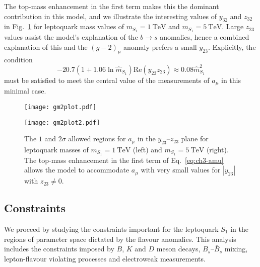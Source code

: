 The top-mass enhancement in the first term makes this the dominant contribution
in this model, and we illustrate the interesting values of $y_{32}$ and $z_{32}$
in Fig.~\ref{fig:ch3-gm2plots} for leptoquark mass values of
$m_{S_{1}}=\SI{1}{\TeV}$ and $m_{S_{1}}=\SI{5}{\TeV}$. Large $z_{23}$ values
assist the model's explanation of the $b \to s$ anomalies, hence a combined
explanation of this and the $(g-2)_\mu$ anomaly prefers a small $y_{23}$.
Explicitly, the condition~\cite{Bauer:2015knc}
\begin{equation} \label{eq:ch3-bnamueq}
  -20.7 (1 + 1.06 \ln\hat{m}_{S_{1}}) \text{Re}(y_{23} z_{23}) \approx 0.08 \hat{m}_{S_{1}}^2
\end{equation}
must be satisfied to meet the central value of the measurements of $a_\mu$ in
this minimal case.

\begin{figure}[t]
  \centering
\begin{minipage}[t]{.45\linewidth}
\centering \texttt{[image: gm2plot.pdf]}
 \label{fig:ch3-gm2plot}
\end{minipage}%
\hfill
\begin{minipage}[t]{.45\linewidth}
\centering \texttt{[image: gm2plot2.pdf]}
 \label{fig:ch3-gm2plot2}
\end{minipage}
\caption[The $1$ and $2\sigma$ allowed regions for $a_\mu$ in the
$y_{23}$--$z_{23}$ plane for leptoquark masses of $m_{S_{1}} = \SI{1}{\TeV}$
(left) and $m_{S_{1}} = \SI{5}{\TeV}$ (right).]{The $1$ and $2\sigma$ allowed
  regions for $a_\mu$ in the $y_{23}$--$z_{23}$ plane for leptoquark masses of
  $m_{S_{1}} = \SI{1}{\TeV}$ (left) and $m_{S_{1}} = \SI{5}{\TeV}$ (right). The
  top-mass enhancement in the first term of Eq.~\eqref{eq:ch3-amu} allows the model
  to accommodate $a_\mu$ with very small values for $|y_{23}|$ with
  $z_{23} \neq 0$.}\label{fig:ch3-gm2plots}
\end{figure}

\subsection{Constraints}
\label{sec:ch3-constraints}

We proceed by studying the constraints important for the leptoquark $S_{1}$ in
the regions of parameter space dictated by the flavour anomalies. This analysis
includes the constraints imposed by $B$, $K$ and $D$ meson decays,
$B_s$--$\bar{B}_s$ mixing, lepton-flavour violating processes and electroweak
measurements.

